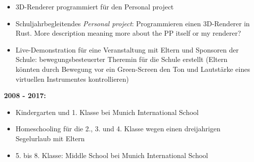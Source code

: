 \documentclass[12pt]{article}
\newcommand{\ask}[1]{{\color{red}#1}}
\begin{document}
{\begin{itemize}
\begin{itemize}
    \item \glqq Science Extension\grqq: erweiterte Physik, Chemie und Biologie, 3 Stunden pro Woche

    \item Musik, 3 Stunden pro Woche
    \end{itemize}

  \item 3D-Renderer programmiert f{\"u}r den \glqq Personal project\grqq

  \item Schuljahrbegleitendes \textit{\glqq Personal project\grqq}:
    Programmieren einen 3D-Renderer in Rust. \ask{More description meaning more
      about the PP itself or my renderer?}

  \item Live-Demonstration f{\"u}r eine Veranstaltung mit Eltern und Sponsoren
    der Schule: bewegungsbesteuerter Theremin f{\"u}r die Schule erstellt
    (Eltern k{\"o}nnten durch Bewegung vor ein Green-Screen den Ton und
    Lautst{\"a}rke eines virtuellen Instrumentes kontrollieren)
  \end{itemize}

  \textbf{2008 - 2017:
  }
  \vspace{-10pt}
  \begin{itemize}
    \itemsep3pt
  \item Kindergarten und 1. Klasse bei Munich International School

  \item Homeschooling f{\"u}r die 2., 3. und 4. Klasse wegen einen dreijahrigen Segelurlaub mit Eltern

  \item 5. bis 8. Klasse: Middle School bei Munich International School
  \end{itemize}


}
\end{document}
